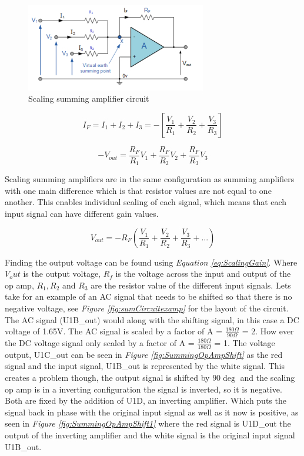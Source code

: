 \begin{figure}[h]
    \centering
    \includegraphics[width=0.70\textwidth]{graphics/SummingOpAmp.png}
    \caption{Scaling summing amplifier circuit \cite{noauthor_summing_2013}}
    \label{fig:SummingOpAmp}
\end{figure}


\begin{equation}
    I_F = I_1 + I_2 + I_3 = -[\frac{V_1}{R_{1}} + \frac{V_2}{R_{2}} + \frac{V_3}{R_{3}}]
\end{equation}


$$-V_{out} = \frac{R_F}{R_{1}}V_1 +\frac{R_F}{R_{2}}V_2 +\frac{R_F}{R_{3}}V_3$$

Scaling summing amplifiers are in the same configuration as summing amplifiers with one main difference which is that resistor values are not equal to one another.
This enables individual scaling of each signal, which means that each input signal can have different gain values.

\begin{equation}
    V_{out} = -R_F(\frac{V_1}{R_{1}} +\frac{V_2}{R_{2}} +\frac{V_3}{R_{3}} + ...)
    \label{eq:ScalingGain}
\end{equation}

Finding the output voltage can be found using \textit{Equation \ref{eq:ScalingGain}}.
Where $V_out$ is the output voltage, $R_f$ is the voltage across the input and output of the op amp, $R_1, R_2$ and $R_3$ are the resistor value of the different input signals.
Lets take for an example of an AC signal that needs to be shifted so that there is no negative voltage, see \textit{Figure \ref{fig:sumCircuitexamp}} for the layout of the circuit.
The AC signal (U1B\_out) would along with the shifting signal, in this case a DC voltage of 1.65V.
The AC signal is scaled by a factor of A = $\frac{180\Omega}{90\Omega}$ = 2.
How ever the DC voltage signal only scaled by a factor of A = $\frac{180\Omega}{180\Omega}$ = 1.
The voltage output, U1C\_out can be seen in \textit{Figure \ref{fig:SummingOpAmpShift}} as the red signal and the input signal, U1B\_out is represented by the white signal.
This creates a problem though, the output signal is shifted by $90\deg$ and the scaling op amp is in a inverting configuration the signal is inverted, so it is negative.
Both are fixed by the addition of U1D, an inverting amplifier.
Which puts the signal back in phase with the original input signal as well as it now is positive, as seen in \textit{Figure \ref{fig:SummingOpAmpShift1}} where the red signal is U1D\_out the output of the inverting amplifier and the white signal is the original input signal U1B\_out.



